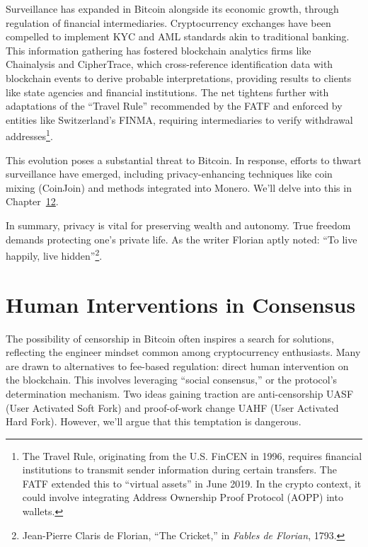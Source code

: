 \documentclass[
  a5paper,
  smalldemyvopaper,10pt,twoside,onecolumn,openright,extrafontsizes,hidelinks]{memoir}
\begin{document}
Surveillance has expanded in Bitcoin alongside its economic growth,
through regulation of financial intermediaries. Cryptocurrency exchanges
have been compelled to implement KYC and AML standards akin to
traditional banking. This information gathering has fostered blockchain
analytics firms like Chainalysis and CipherTrace, which cross-reference
identification data with blockchain events to derive probable
interpretations, providing results to clients like state agencies and
financial institutions. The net tightens further with adaptations of the
``Travel Rule'' recommended by the FATF and enforced by entities like
Switzerland's FINMA, requiring intermediaries to verify withdrawal
addresses\footnote{The Travel Rule, originating from the U.S. FinCEN in
  1996, requires financial institutions to transmit sender information
  during certain transfers. The FATF extended this to ``virtual assets''
  in June 2019. In the crypto context, it could involve integrating
  Address Ownership Proof Protocol (AOPP) into wallets.}.

This evolution poses a substantial threat to Bitcoin. In response,
efforts to thwart surveillance have emerged, including privacy-enhancing
techniques like coin mixing (CoinJoin) and methods integrated into
Monero. We'll delve into this in Chapter~\hyperref[ch:rouages]{12}.

In summary, privacy is vital for preserving wealth and autonomy. True
freedom demands protecting one's private life. As the writer Florian
aptly noted: ``To live happily, live hidden''\footnote{Jean-Pierre
  Claris de Florian, ``The Cricket,'' in \emph{Fables de Florian}, 1793.}.

\section*{Human Interventions in
Consensus}\label{les-interventions-humaines-dans-le-consensus}


The possibility of censorship in Bitcoin often inspires a search for
solutions, reflecting the engineer mindset common among cryptocurrency
enthusiasts. Many are drawn to alternatives to fee-based regulation:
direct human intervention on the blockchain. This involves leveraging
``social consensus,'' or the protocol's determination mechanism. Two
ideas gaining traction are anti-censorship UASF (User Activated Soft
Fork) and proof-of-work change UAHF (User Activated Hard Fork). However,
we'll argue that this temptation is dangerous.
\end{document}
